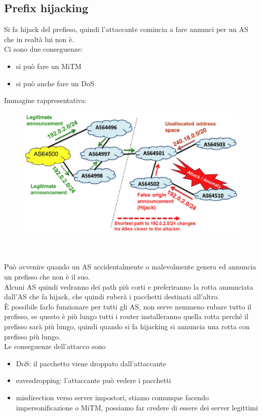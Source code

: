 \documentclass[12pt, oneside]{extbook} %
\begin{document}
\subsection{Prefix hijacking}
Si fa hijack del prefisso, quindi l'attaccante comincia a fare annunci per un AS che in realtà lui non è.
\\Ci sono due conseguenze:
\begin{itemize}
    \item si può fare un MiTM
    \item si può anche fare un DoS
\end{itemize}
Immagine rappresentativa:\\
\begin{figure}[h!]
    \centering
    \includegraphics[scale=0.5]{../../immagini/perf_hijack}
\end{figure}\\\\
Può avvenire quando un AS accidentalmente o malevolmente genera ed annuncia un prefisso che non è il suo.
\\Alcuni AS quindi vedranno dei path più corti e preferiranno la rotta annunciata dall'AS che fa hijack, che quindi ruberà i pacchetti destinati all'altro.
\\È possibile farlo funzionare per tutti gli AS, non serve nemmeno rubare tutto il prefisso, se questo è più lungo tutti i router installeranno quella rotta perché il prefisso sarà più lungo, quindi quando si fa hijacking si annuncia una rotta con prefisso più lungo.
\\Le conseguenze dell'attacco sono
\begin{itemize}
    \item DoS: il pacchetto viene droppato dall'attaccante
    \item eavesdropping: l'attaccante può vedere i pacchetti
    \item misdirection verso server impostori, stiamo comunque facendo impersonificazione o MiTM, possiamo far credere di essere dei server legittimi
\end{itemize}
\end{document}
